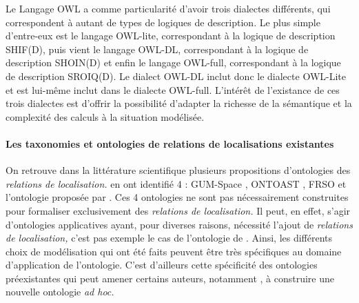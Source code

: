 Le Langage OWL a comme particularité d'avoir trois dialectes
différents, qui correspondent à autant de types de logiques de
description. Le plus simple d'entre-eux est le langage OWL-lite,
correspondant à la logique de description SHIF(D), puis vient le
langage OWL-DL, correspondant à la logique de description SHOIN(D) et
enfin le langage OWL-full, correspondant à la logique de description
SROIQ(D). Le dialect OWL-DL inclut donc le dialecte OWL-Lite et est
lui-même inclut dans le dialecte OWL-full. L’intérêt de l'existance de
ces trois dialectes est d’offrir la possibilité d'adapter la richesse
de la sémantique et la complexité des calculs à la situation
modélisée.

\paragraph{Les taxonomies et ontologies de relations de localisations
  existantes}

On retrouve dans la littérature scientifique plusieurs propositions
d'ontologies des \emph{relations de localisation.}
\textcite{Duchene2019} en ont identifié 4 : GUM-Space
\autocite{Bateman2010}, ONTOAST \autocite{Miron2007}, FRSO
\autocite{Hudelot2008a} et l'ontologie proposée par
\textcite{Dasiopoulou2005}. Ces 4 ontologies ne sont pas
nécessairement construites pour formaliser exclusivement des
\emph{relations de localisation.} Il peut, en effet, s'agir
d'ontologies applicatives ayant, pour diverses raisons, nécessité
l'ajout de \emph{relations de localisation,} c'est pas exemple le cas
de l'ontologie de \textcite{Dasiopoulou2005}. Ainsi, les différents
choix de modélisation qui ont été faits peuvent être très spécifiques
au domaine d’application de l'ontologie. C'est d'ailleurs cette
spécificité des ontologies préexistantes qui peut amener certains
auteurs, notamment \textcite{Hudelot2008a}, à construire une nouvelle
ontologie \emph{ad hoc.}

